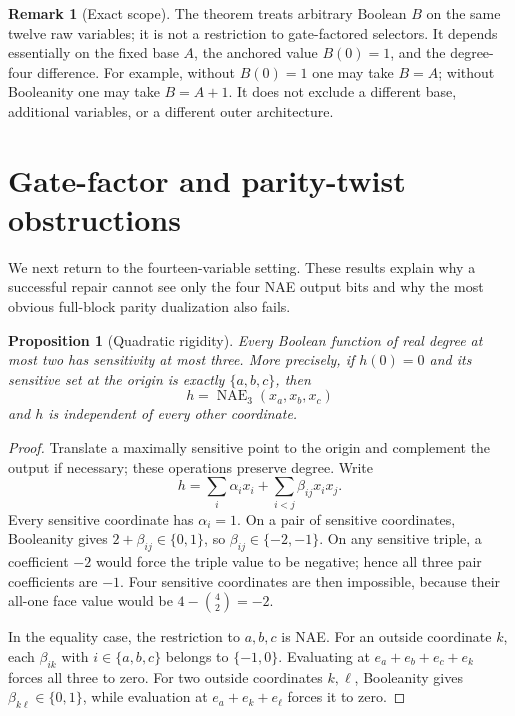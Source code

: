 \documentclass[11pt]{article}
\newtheorem{proposition}[theorem]{Proposition}
\theoremstyle{definition}
\newtheorem{remark}[theorem]{Remark}
\newcommand{\NAE}{\operatorname{NAE}}
\begin{document}
\begin{remark}[Exact scope]
The theorem treats arbitrary Boolean \(B\) on the same twelve raw variables;
it is not a restriction to gate-factored selectors.  It depends essentially on
the fixed base \(A\), the anchored value \(B(0)=1\), and the degree-four
difference.  For example, without \(B(0)=1\) one may take \(B=A\); without
Booleanity one may take \(B=A+1\).  It does not exclude a different base,
additional variables, or a different outer architecture.
\end{remark}

\section{Gate-factor and parity-twist obstructions}\label{sec:central-obstructions}

We next return to the fourteen-variable setting.  These results explain why a
successful repair cannot see only the four NAE output bits and why the most
obvious full-block parity dualization also fails.

\begin{proposition}[Quadratic rigidity]\label{prop:quadratic}
Every Boolean function of real degree at most two has sensitivity at most
three.  More precisely, if \(h(0)=0\) and its sensitive set at the origin is
exactly \(\{a,b,c\}\), then
\[
 h=\NAE_3(x_a,x_b,x_c)
\]
and \(h\) is independent of every other coordinate.
\end{proposition}

\begin{proof}
Translate a maximally sensitive point to the origin and complement the output
if necessary; these operations preserve degree.  Write
\[
 h=\sum_i\alpha_i x_i+\sum_{i<j}\beta_{ij}x_ix_j.
\]
Every sensitive coordinate has \(\alpha_i=1\).  On a pair of sensitive
coordinates, Booleanity gives \(2+\beta_{ij}\in\{0,1\}\), so
\(\beta_{ij}\in\{-2,-1\}\).  On any sensitive triple, a coefficient \(-2\)
would force the triple value to be negative; hence all three pair coefficients
are \(-1\).  Four sensitive coordinates are then impossible, because their
all-one face value would be \(4-\binom42=-2\).

In the equality case, the restriction to \(a,b,c\) is NAE.  For an outside
coordinate \(k\), each \(\beta_{ik}\) with \(i\in\{a,b,c\}\) belongs to
\(\{-1,0\}\).  Evaluating at \(e_a+e_b+e_c+e_k\) forces all three to zero.
For two outside coordinates \(k,\ell\), Booleanity gives
\(\beta_{k\ell}\in\{0,1\}\), while evaluation at
\(e_a+e_k+e_\ell\) forces it to zero.
\end{proof}
\end{document}
